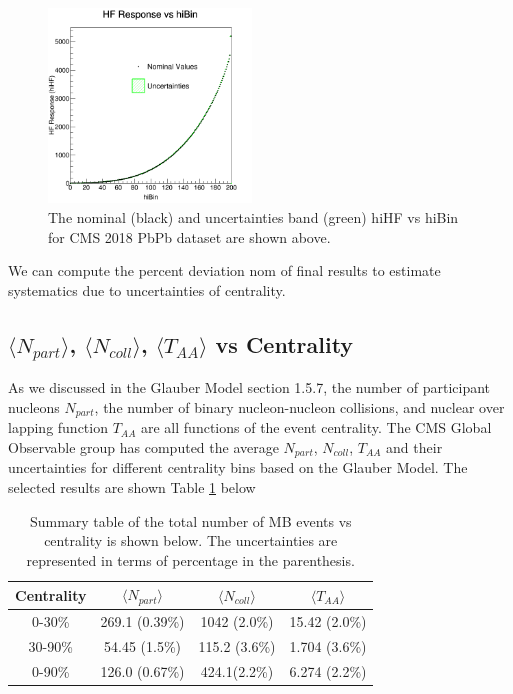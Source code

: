 \begin{figure}[h]
\begin{center}
\includegraphics[width= 0.48\textwidth]{Figures/Chapter4/hiHFvsCent.png}
\caption{The nominal (black) and uncertainties band (green) hiHF vs hiBin for CMS 2018 PbPb dataset are shown above.}
\label{hiHFvsCent}
\end{center}
\end{figure}


We can compute the percent deviation nom of final results to estimate systematics due to uncertainties of centrality. 


\subsection{$\langle N_{part} \rangle$, $\langle N_{coll} \rangle$, $\langle T_{AA} \rangle$ vs Centrality}

As we discussed in the Glauber Model \cite{CentPlot,Glauber} section 1.5.7, the number of participant nucleons $N_{part}$, the number of binary nucleon-nucleon collisions, and nuclear over lapping function $T_{AA}$ are all functions of the event centrality. The CMS Global Observable group has computed the average $N_{part} $, $N_{coll} $, $T_{AA}$ and their uncertainties  for different centrality bins based on the Glauber Model. The selected results are shown Table \ref{GOvsCent} below


\begin{table}[h]
\begin{center}
\caption{Summary table of the total number of MB events vs centrality is shown below. The uncertainties are represented in terms of percentage in the parenthesis.}
\vspace{1em}
\label{GOvsCent}
  \begin{tabular}{ |c | c| c| c|}
    \hline 
Centrality &  $\langle N_{part} \rangle$ &$\langle N_{coll} \rangle$  & $\langle T_{AA} \rangle$  \\
     \hline
         \hline
0-30\% &  269.1 (0.39\%)  &  1042 (2.0\%) &	15.42 (2.0\%)   \\
30-90\% & 54.45 (1.5\%)   & 115.2 (3.6\%)  &   1.704 (3.6\%)  \\
0-90\% & 126.0 (0.67\%)   &  424.1(2.2\%)  &    6.274 (2.2\%)  \\
     \hline
    \hline
\end{tabular}
\end{center}
\end{table}

